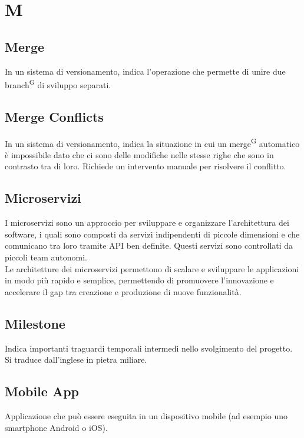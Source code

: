 \section{M}


\subsection{Merge}
In un sistema di versionamento, indica l'operazione che permette di unire due branch\textsuperscript{G} di sviluppo separati.

\subsection{Merge Conflicts}
In un sistema di versionamento, indica la situazione in cui un merge\textsuperscript{G} automatico è impossibile dato che ci sono delle modifiche nelle stesse righe che sono in contrasto tra di loro. Richiede un intervento manuale  per risolvere il conflitto.

\subsection{Microservizi} I microservizi sono un approccio per sviluppare e organizzare l’architettura dei software, i quali sono composti da servizi indipendenti di piccole dimensioni e che comunicano tra loro tramite API ben definite. Questi servizi sono controllati da piccoli team autonomi. \\
Le architetture dei microservizi permettono di scalare e sviluppare le applicazioni in modo più rapido e semplice, permettendo di promuovere l’innovazione e accelerare il gap tra creazione e produzione di nuove funzionalità.

\subsection{Milestone}
Indica importanti traguardi temporali intermedi nello svolgimento del progetto. Si traduce dall'inglese in pietra miliare. 

\subsection{Mobile App} Applicazione che può essere eseguita in un dispositivo mobile (ad esempio uno smartphone Android o iOS).

\clearpage